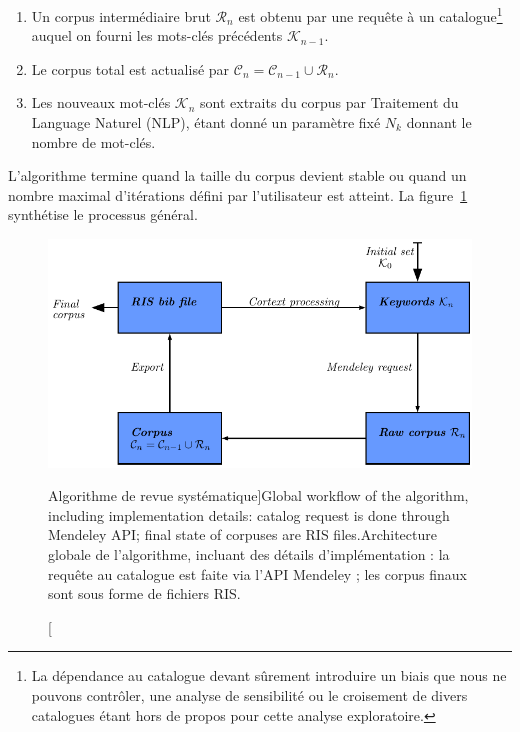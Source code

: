 {

\begin{enumerate}
\item Un corpus intermédiaire brut $\mathcal{R}_n$ est obtenu par une requête à un catalogue\footnote{La dépendance au catalogue devant sûrement introduire un biais que nous ne pouvons contrôler, une analyse de sensibilité ou le croisement de divers catalogues étant hors de propos pour cette analyse exploratoire.}
 auquel on fourni les mots-clés précédents $\mathcal{K}_{n-1}$.
\item Le corpus total est actualisé par $\mathcal{C}_n = \mathcal{C}_{n-1} \cup \mathcal{R}_n$.
\item Les nouveaux mot-clés $\mathcal{K}_n$ sont extraits du corpus par Traitement du Language Naturel (NLP), étant donné un paramètre fixé $N_k$ donnant le nombre de mot-clés.
\end{enumerate}

L'algorithme termine quand la taille du corpus devient stable ou quand un nombre maximal d'itérations défini par l'utilisateur est atteint. La figure~\ref{fig:quantepistemo:algo} synthétise le processus général.
}


\begin{figure}
\centering
\includegraphics[width=0.8\linewidth]{Figures/QuantEpistemo/schema_algo}
\caption[Systematic review algorithm workflow][Algorithme de revue systématique]{Global workflow of the algorithm, including implementation details: catalog request is done through Mendeley API; final state of corpuses are RIS files.\label{fig:quantepistemo:algo}}{Architecture globale de l'algorithme, incluant des détails d'implémentation : la requête au catalogue est faite via l'API Mendeley ; les corpus finaux sont sous forme de fichiers RIS.\label{fig:quantepistemo:algo}}
\end{figure}



